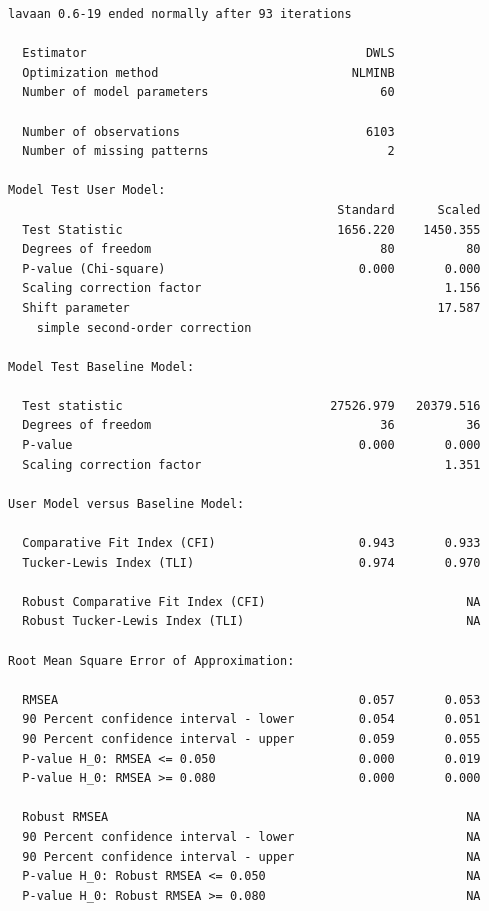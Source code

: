 \documentclass[
  12pt,
  a4paper,
  DIV=11,
  numbers=noendperiod]{scrartcl}
\begin{document}
\begin{verbatim}
lavaan 0.6-19 ended normally after 93 iterations

  Estimator                                       DWLS
  Optimization method                           NLMINB
  Number of model parameters                        60

  Number of observations                          6103
  Number of missing patterns                         2

Model Test User Model:
                                              Standard      Scaled
  Test Statistic                              1656.220    1450.355
  Degrees of freedom                                80          80
  P-value (Chi-square)                           0.000       0.000
  Scaling correction factor                                  1.156
  Shift parameter                                           17.587
    simple second-order correction                                

Model Test Baseline Model:

  Test statistic                             27526.979   20379.516
  Degrees of freedom                                36          36
  P-value                                        0.000       0.000
  Scaling correction factor                                  1.351

User Model versus Baseline Model:

  Comparative Fit Index (CFI)                    0.943       0.933
  Tucker-Lewis Index (TLI)                       0.974       0.970
                                                                  
  Robust Comparative Fit Index (CFI)                            NA
  Robust Tucker-Lewis Index (TLI)                               NA

Root Mean Square Error of Approximation:

  RMSEA                                          0.057       0.053
  90 Percent confidence interval - lower         0.054       0.051
  90 Percent confidence interval - upper         0.059       0.055
  P-value H_0: RMSEA <= 0.050                    0.000       0.019
  P-value H_0: RMSEA >= 0.080                    0.000       0.000
                                                                  
  Robust RMSEA                                                  NA
  90 Percent confidence interval - lower                        NA
  90 Percent confidence interval - upper                        NA
  P-value H_0: Robust RMSEA <= 0.050                            NA
  P-value H_0: Robust RMSEA >= 0.080                            NA


\end{verbatim}
\end{document}
